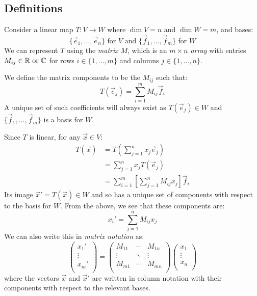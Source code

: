 \documentclass[../main.tex]{subfiles}
\begin{document}
\subsection{Definitions}
\label{matrixDef}
\begin{definition}
  Consider a linear map $T: V \to W$ where $\dim V = n$ and $\dim W = m$, and bases:
  \[
    \{\vec{e}_1, \ldots, \vec{e}_n\} \text{ for $V$ and }
    \{\vec{f}_1, \ldots, \vec{f}_m\} \text{ for $W$}
  \]
  We can represent $T$ using the \textit{matrix} $M$, which is an \textit{$m \times n$ array} with entries $M_{i j} \in \mathbb{R} \text{ or }\mathbb{C}$ for rows $i \in \{1, \ldots, m\}$ and columns $j \in \{1, \ldots, n\}$.

  We define the matrix components to be the $M_{i j}$ such that:
  \[
    T(\vec{e}_j) = \sum_{i = 1}^{m} M_{i j}\vec{f}_i
  \]
  A unique set of such coefficients will always exist as $T(\vec{e}_j) \in W$ and $\{\vec{f}_1, \ldots, \vec{f}_m\}$ is a basis for $W$.
\end{definition}
Since $T$ is linear, for any $\vec{x} \in V$:
\begin{align*}
  T(\vec{x}) &= T\left(\sum_{j = 1}^{n} x_j \vec{e}_j\right) \\
             &= \sum_{j = 1}^{n} x_j T(\vec{e}_j) \\
             &= \sum_{i = 1}^{m} \left[\sum_{j = 1}^{n} M_{i j} x_j\right] \vec{f}_i
\end{align*}
Its image $\vec{x}' = T(\vec{x}) \in W$ and so has a unique set of components with respect to the basis for $W$.
From the above, we see that these components are:
\[
  x_i' = \sum_{j = 1}^{n} M_{i j}x_j
\]
We can also write this in \textit{matrix notation} as:
\[
  \begin{pmatrix}
  x_1' \\
  \vdots \\
  x_m' \\
  \end{pmatrix} =
  \begin{pmatrix}
  M_{1 1} & \cdots & M_{1 n} \\
  \vdots & \ddots & \vdots \\
  M_{m 1} & \cdots & M_{m n} \\
  \end{pmatrix}
  \begin{pmatrix}
  x_1 \\
  \vdots \\
  x_n \\
  \end{pmatrix}
\]
where the vectors $\vec{x}$ and $\vec{x}'$ are written in column notation with their components with respect to the relevant bases.
\end{document}
